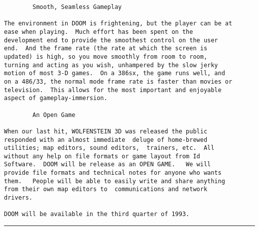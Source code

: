 \begin{verbatim}
        Smooth, Seamless Gameplay

The environment in DOOM is frightening, but the player can be at
ease when playing.  Much effort has been spent on the
development end to provide the smoothest control on the user
end.  And the frame rate (the rate at which the screen is
updated) is high, so you move smoothly from room to room,
turning and acting as you wish, unhampered by the slow jerky
motion of most 3-D games.  On a 386sx, the game runs well, and
on a 486/33, the normal mode frame rate is faster than movies or
television.  This allows for the most important and enjoyable
aspect of gameplay-immersion.

        An Open Game

When our last hit, WOLFENSTEIN 3D was released the public
responded with an almost immediate  deluge of home-brewed
utilities; map editors, sound editors,  trainers, etc.  All
without any help on file formats or game layout from Id
Software.  DOOM will be release as an OPEN GAME.   We will
provide file formats and technical notes for anyone who wants
them.   People will be able to easily write and share anything
from their own map editors to  communications and network
drivers.

DOOM will be available in the third quarter of 1993. 
\end{verbatim}
\par \hrule
